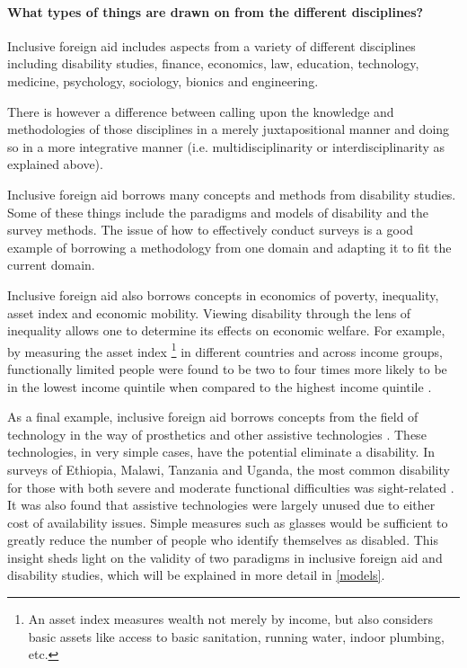 \documentclass[a4paper]{article}
\begin{document}
\paragraph{What types of things are drawn on from the different disciplines?}

Inclusive foreign aid includes aspects from a variety of different disciplines
including disability studies, finance, economics, law, education, technology,
medicine, psychology, sociology, bionics and engineering. 

There is however a difference between calling upon the knowledge and
methodologies of those disciplines in a merely juxtapositional manner and
doing so in a more integrative manner (i.e. multidisciplinarity or
interdisciplinarity as explained above).

Inclusive foreign aid borrows many concepts and methods from disability
studies. Some of these things include the paradigms and models of disability
and the survey methods. The issue of how to effectively conduct surveys is a
good example of borrowing a methodology from one domain and adapting it to fit
the current domain. 

Inclusive foreign aid also borrows concepts in economics of poverty,
inequality, asset index and economic mobility. Viewing disability through the
lens of inequality allows one to determine its effects on economic welfare.
For example, by measuring the asset index \footnote{An asset index measures
wealth not merely by income, but also considers basic assets like access to
basic sanitation, running water, indoor plumbing, etc.} in different countries
and across income groups, functionally limited people were found to be two to
four times more likely to be in the lowest income quintile when compared to
the highest income quintile \citep{mitra2018disability}.  

As a final example, inclusive foreign aid borrows concepts from the field of
technology in the way of prosthetics and other assistive technologies
\citep{roulstone2016disability}. These technologies, in very simple cases,
have the potential eliminate a disability. In surveys of Ethiopia, Malawi,
Tanzania and Uganda, the most common disability for those with both severe and
moderate functional difficulties was sight-related
\citep{mitra2018disability}. It was also found that assistive technologies
were largely unused due to either cost of availability issues. Simple measures
such as glasses would be sufficient to greatly reduce the number of people who
identify themselves as disabled. This insight sheds light on the
validity of two paradigms in inclusive foreign aid and disability studies,
which will be explained in more detail in \autoref{models}.
\end{document}
